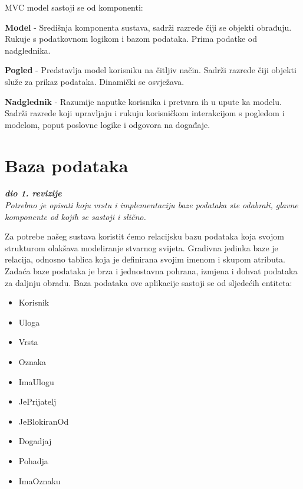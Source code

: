 	\indent MVC model sastoji se od komponenti:
	\begin{packed_item}
		\item 	\textbf{Model} - Središnja komponenta sustava, sadrži razrede čiji se objekti obrađuju. Rukuje s podatkovnom logikom i bazom podataka. Prima podatke od nadglednika.
		\item 	\textbf{Pogled} - Predstavlja model korisniku na čitljiv način. Sadrži razrede čiji objekti služe za prikaz podataka. Dinamički se osvježava.
		\item	\textbf{Nadglednik} - Razumije naputke korisnika i pretvara ih u upute ka modelu. Sadrži razrede koji upravljaju i rukuju korisničkom interakcijom s pogledom i modelom, poput poslovne logike i odgovora na događaje.
	\end{packed_item}

	\eject
		

		

				
		\section{Baza podataka}
			
			\textbf{\textit{dio 1. revizije}}\\
			
		\textit{Potrebno je opisati koju vrstu i implementaciju baze podataka ste odabrali, glavne komponente od kojih se sastoji i slično.}
		
		Za potrebe našeg sustava koristit ćemo relacijsku bazu podataka koja svojom strukturom olakšava modeliranje stvarnog svijeta. Gradivna jedinka baze je relacija, odnosno tablica koja je definirana svojim imenom i skupom atributa. Zadaća baze podataka je brza i jednostavna pohrana, izmjena i dohvat podataka za daljnju obradu. Baza podataka ove aplikacije sastoji se od sljedećih entiteta:
		
		\begin{itemize}
			\item Korisnik
			\item Uloga
			\item Vrsta
			\item Oznaka
			\item ImaUlogu
			\item JePrijatelj
			\item JeBlokiranOd
			\item Dogadjaj
			\item Pohadja
			\item ImaOznaku
			
		\end{itemize}
		
